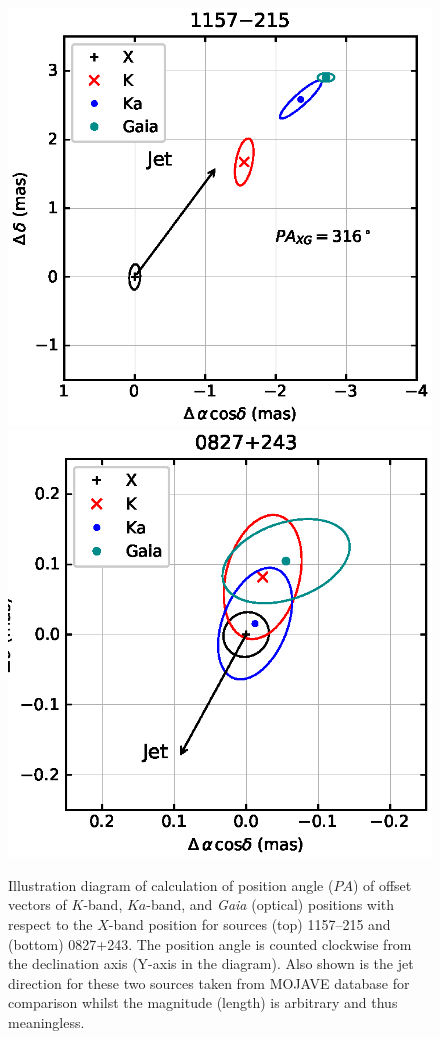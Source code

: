 \documentclass{aa-note}   %
\begin{document}
\begin{figure}[hbtp]
  \centering
  \includegraphics[width=\columnwidth]{figs/illustration-diagram1}
  \includegraphics[width=\columnwidth]{figs/illustration-diagram2}
  \caption[]{\label{fig:illustration-diagram}
      Illustration diagram of calculation of position angle ($PA$) of offset vectors of $K$-band, $Ka$-band, and {\it Gaia} (optical) positions with respect to the $X$-band position for sources (top) 1157--215 and (bottom) 0827+243.
      The position angle is counted clockwise from the declination axis (Y-axis in the diagram).
      Also shown is the jet direction for these two sources taken from MOJAVE database \citep{2019ApJ...874...43L} for comparison whilst the magnitude (length) is arbitrary and thus meaningless.
  }
\end{figure}
\end{document}
